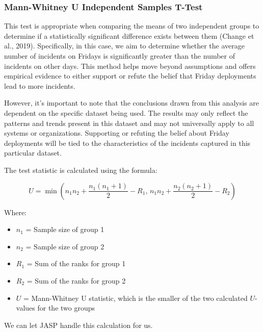 \documentclass{article}
\begin{document}
\subsubsection{Mann-Whitney U Independent Samples T-Test}

This test is appropriate when comparing the means of two independent groups to determine if a statistically significant difference exists between them (Change et al., 2019). Specifically, in this case, we aim to determine whether the average number of incidents on Fridays is significantly greater than the number of incidents on other days. This method helps move beyond assumptions and offers empirical evidence to either support or refute the belief that Friday deployments lead to more incidents.

 However, it’s important to note that the conclusions drawn from this analysis are dependent on the specific dataset being used. The results may only reflect the patterns and trends present in this dataset and may not universally apply to all systems or organizations. Supporting or refuting the belief about Friday deployments will be tied to the characteristics of the incidents captured in this particular dataset.

 The test statistic is calculated using the formula:

 
\begin{equation}
U = \min \left( n_1 n_2 + \frac{n_1 (n_1 + 1)}{2} - R_1, \, n_1 n_2 + \frac{n_2 (n_2 + 1)}{2} - R_2 \right)
\end{equation}

Where:
\begin{itemize}
    \item $n_1$ = Sample size of group 1
    \item $n_2$ = Sample size of group 2
    \item $R_1$ = Sum of the ranks for group 1
    \item $R_2$ = Sum of the ranks for group 2
    \item $U$ = Mann-Whitney U statistic, which is the smaller of the two calculated \( U \)-values for the two groups
\end{itemize}

We can let JASP handle this calculation for us.
\end{document}
